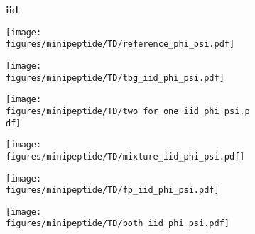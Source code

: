 \begin{figure}
    \begin{minipage}{\textwidth}
        \begin{subfigure}[c]{0.05\textwidth}
        \vspace{-0.2cm}
            \textbf{iid}
        \end{subfigure}
        \begin{subfigure}[c]{0.15\textwidth}
            \centering
            \texttt{[image: figures/minipeptide/TD/reference\_phi\_psi.pdf]}
        \end{subfigure}
        \begin{subfigure}[c]{0.15\textwidth}
            \centering
            \texttt{[image: figures/minipeptide/TD/tbg\_iid\_phi\_psi.pdf]}
        \end{subfigure}
        \begin{subfigure}[c]{0.15\textwidth}
            \centering
            \texttt{[image: figures/minipeptide/TD/two\_for\_one\_iid\_phi\_psi.pdf]}
        \end{subfigure}
        \begin{subfigure}[c]{0.15\textwidth}
            \centering
            \texttt{[image: figures/minipeptide/TD/mixture\_iid\_phi\_psi.pdf]}
        \end{subfigure}
        \begin{subfigure}[c]{0.15\textwidth}
            \centering
            \texttt{[image: figures/minipeptide/TD/fp\_iid\_phi\_psi.pdf]}
        \end{subfigure}
        \begin{subfigure}[c]{0.15\textwidth}
            \centering
            \texttt{[image: figures/minipeptide/TD/both\_iid\_phi\_psi.pdf]}         
        \end{subfigure}
    \end{minipage}


\end{figure}
